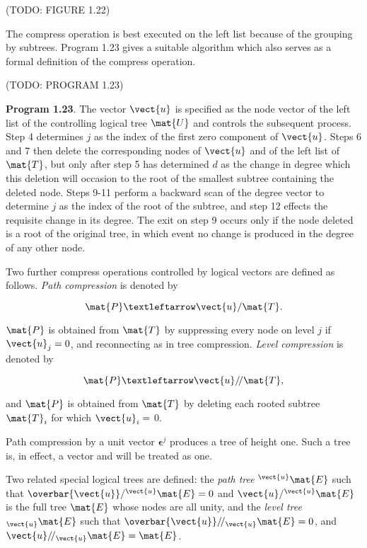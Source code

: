 \par (TODO: FIGURE 1.22)

\par The compress operation is best executed on the left list because of the grouping by subtrees. Program 1.23 gives a suitable algorithm which also serves as a formal definition of the compress operation.

\par (TODO: PROGRAM 1.23)

\par \textbf{Program 1.23}. The vector $\vect{u}$ is specified as the node vector of the left list of the controlling logical tree $\mat{U}$ and controls the subsequent process. Step 4 determines $j$ as the index of the first zero component of $\vect{u}$. Steps 6 and 7 then delete the corresponding nodes of $\vect{u}$ and of the left list of $\mat{T}$, but only after step 5 has determined $d$ as the change in degree which this deletion will occasion to the root of the smallest subtree containing the deleted node. Steps 9-11 perform a backward scan of the degree vector to determine $j$ as the index of the root of the subtree, and step 12 effects the requisite change in its degree. The exit on step 9 occurs only if the node deleted is a root of the original tree, in which event no change is produced in the degree of any other node.


\par Two further compress operations controlled by logical vectors are defined as follows. \textit{Path compression} is denoted by

$$
  \mat{P} ← \vect{u}/\mat{T}.
$$

\noindent $\mat{P}$ is obtained from $\mat{T}$ by suppressing every node on level $j$ if $\vect{u}_j = 0$, and reconnecting as in tree compression. \textit{Level compression} is denoted by

$$
  \mat{P} ← \vect{u}/\!/\mat{T},
$$

\noindent and $\mat{P}$ is obtained from $\mat{T}$ by deleting each rooted subtree $\mat{T}_i$ for which $\vect{u}_i =$ 0.

\par Path compression by a unit vector $\textbf{ϵ}^j$ produces a tree of height one. Such a tree is, in effect, a vector and will be treated as one.

\par Two related special logical trees are defined: the \textit{path tree} ${}^{\vect{u}}\mat{E}$ such that $\overbar{\vect{u}}/{}^{\vect{ u}}\mat{E} = 0$ and $\vect{u}/{}^{\vect{u}}\mat{E}$ is the full tree $\mat{E}$ whose nodes are all unity, and the \textit{level tree} 
${}_{\vect{u}}\mat{E}$ such that $\overbar{\vect{u}}/\!/{}_{\vect{u}}\mat{E} = 0$, and $\vect{u}/\!/{}_{\vect{u}}\mat{E} = \mat{E}$.
